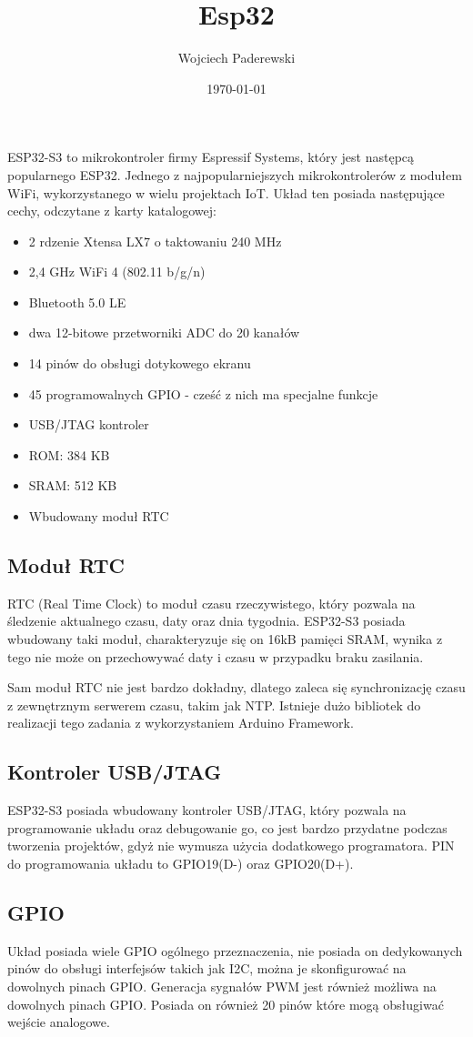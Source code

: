 \documentclass[../main.tex]{subfiles}
\author{Wojciech Paderewski}
\date{\today}
\title{Esp32}
\begin{document}
ESP32-S3 to mikrokontroler firmy Espressif Systems, który jest następcą popularnego ESP32.
Jednego z najpopularniejszych mikrokontrolerów z modułem WiFi, wykorzystanego w wielu projektach IoT\cite{st:esp32-book}.
Układ ten posiada następujące cechy, odczytane z karty katalogowej\cite{st:esp32}:

\begin{itemize}
\item 2 rdzenie Xtensa LX7 o taktowaniu 240 MHz
\item 2,4 GHz WiFi 4 (802.11 b/g/n)
\item Bluetooth 5.0 LE
\item dwa 12-bitowe przetworniki ADC do 20 kanałów
\item 14 pinów do obsługi dotykowego ekranu
\item 45 programowalnych GPIO - cześć z nich ma specjalne funkcje
\item USB/JTAG kontroler
\item ROM: 384 KB
\item SRAM: 512 KB
\item Wbudowany moduł RTC
\end{itemize}
\subsection{Moduł RTC}

RTC (Real Time Clock) to moduł czasu rzeczywistego, który pozwala na śledzenie aktualnego czasu, daty oraz dnia tygodnia. 
ESP32-S3 posiada wbudowany taki moduł, charakteryzuje się on 16kB pamięci SRAM, wynika z tego nie może on przechowywać daty i czasu w przypadku braku zasilania.

Sam moduł RTC nie jest bardzo dokładny, dlatego zaleca się synchronizację czasu z zewnętrznym serwerem czasu, takim jak NTP.
Istnieje dużo bibliotek do realizacji tego zadania z wykorzystaniem Arduino Framework.

\subsection{Kontroler USB/JTAG}
ESP32-S3 posiada wbudowany kontroler USB/JTAG, który pozwala na programowanie układu oraz debugowanie go, co jest bardzo przydatne podczas tworzenia projektów,
gdyż nie wymusza użycia dodatkowego programatora. PIN do programowania układu to GPIO19(D-) oraz GPIO20(D+).

\subsection{GPIO}
Układ posiada wiele GPIO ogólnego przeznaczenia, nie posiada on dedykowanych pinów do obsługi interfejsów takich jak I2C, można 
je skonfigurować na dowolnych pinach GPIO. Generacja sygnałów PWM jest również możliwa na dowolnych pinach GPIO. Posiada on również 20 pinów które mogą
obsługiwać wejście analogowe.
\end{document}
